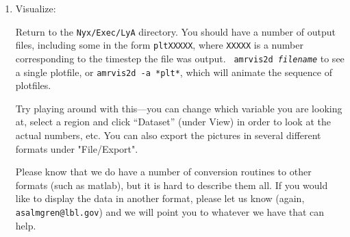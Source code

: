 \begin{enumerate}
\item Visualize:

  Return to the {\tt Nyx/Exec/LyA} directory.  You should
  have a number of output files, including some in the form {\tt *pltXXXXX},
  where {\tt XXXXX} is a number corresponding to the timestep the file
  was output.  {\tt
    amrvis2d {\em filename}} to see a single plotfile, or {\tt amrvis2d -a
  *plt*}, which will animate the sequence of plotfiles.

  Try playing
  around with this---you can change which variable you are
  looking at, select a region and click ``Dataset'' (under View)
  in order to look at the actual numbers, etc. You can also export the
  pictures in several different formats under "File/Export".

Please know that we do have a number of conversion routines to other
formats (such as matlab), but it is hard to describe them all. If you
would like to display the data in another format, please let us know
(again, {\tt asalmgren@lbl.gov}) and we will point you to whatever we have
that can help.

\end{enumerate}
